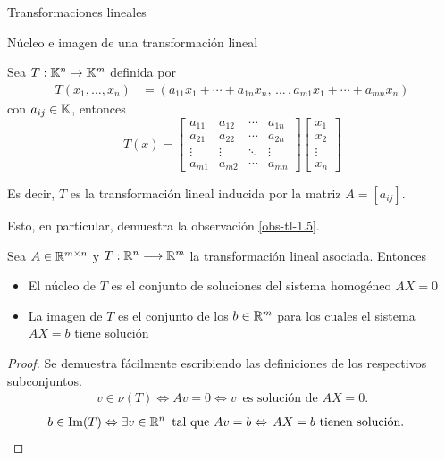 \begin{chapter}{Transformaciones lineales}
\begin{section}{N\'ucleo e imagen de una transformaci\'on lineal}
\begin{observacion}\label{obs-nu-im} 	Sea $T: \mathbb K^n \to \mathbb K^m$ definida por
    \begin{align*}
    T(x_1,\ldots,x_n) &= (a_{11}x_1+\cdots + a_{1n}x_n,\, \ldots\,,a_{m1}x_1+\cdots + a_{mn}x_n )
    \end{align*}
    con $a_{ij} \in \mathbb K$, entonces 
    \begin{equation*}
        T(x) = \begin{bmatrix*}
            a_{11}& a_{12} & \cdots &a_{1n} \\
            a_{21}& a_{22} & \cdots &a_{2n} \\
            \vdots&\vdots&\ddots&\vdots \\
            a_{m1}& a_{m2} & \cdots &a_{mn}
        \end{bmatrix*}
        \begin{bmatrix}
            x_1 \\ x_2 \\ \vdots \\ x_n
        \end{bmatrix}
    \end{equation*} 

    Es decir,  $T$ es la transformación lineal inducida por la matriz $A = [a_{ij}]$. 
 
    Esto, en particular,  demuestra la observación  \ref{obs-tl-1.5}.
\end{observacion}



\begin{proposicion}

    Sea $A\in\mathbb R^{m\times n}$ y $T:\mathbb R^n\longrightarrow\mathbb R^m$ la transformación lineal asociada. Entonces
    \begin{itemize}
     \item El núcleo de $T$ es el conjunto de soluciones del sistema homogéneo $AX=0$
     
     \item La imagen de $T$ es el conjunto de los $b\in\mathbb R^m$ para los cuales el sistema $AX=b$ tiene solución
    \end{itemize}
    \end{proposicion}
    \begin{proof}
        
   
    Se demuestra fácilmente escribiendo las definiciones de los respectivos subconjuntos.
    \begin{align*}
    v\in\nu(T)\Leftrightarrow Av=0\Leftrightarrow v\,\mbox{ es solución de $AX=0$.}
    \end{align*}
    \begin{align*}
    b\in\operatorname{Im}(T)&\Leftrightarrow\exists v\in\mathbb R^n\,\mbox{ tal que } Av=b 
    \Leftrightarrow\,\mbox{$AX=b$ tienen solución}.
    \end{align*}
\end{proof}
    

\end{section}
\end{chapter}
